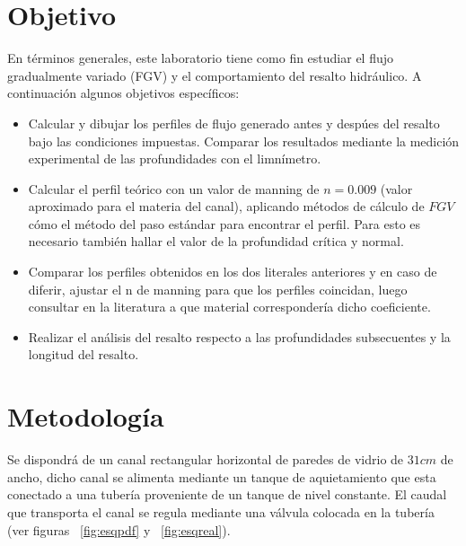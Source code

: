 \documentclass[10pt, a4paper]{exam}
\begin{document}
\section{Objetivo}

En términos generales, este laboratorio tiene como fin estudiar el flujo gradualmente variado (FGV) y el comportamiento del resalto hidráulico. A continuación algunos objetivos específicos:

\begin{itemize}

    \item Calcular y dibujar los perfiles de flujo generado antes y desp\'ues del resalto bajo las condiciones impuestas. Comparar los resultados mediante la medición experimental de las profundidades con el limnímetro.
    
    \item Calcular el perfil teórico con un valor de manning de $n=0.009$ (valor aproximado para el materia del canal), aplicando métodos de cálculo de $FGV$ cómo el método del paso estándar para encontrar el perfil. Para esto es necesario tambi\'en hallar el valor de la profundidad crítica y normal.
    
    \item Comparar los perfiles obtenidos en los dos literales anteriores y en caso de diferir, ajustar el n de manning para que los perfiles coincidan, luego consultar en la literatura a que material correspondería dicho coeficiente.

    \item Realizar el análisis del resalto respecto a las profundidades subsecuentes y la longitud del resalto.
    
\end{itemize}


\section{Metodología}

Se dispondrá de un canal rectangular horizontal de paredes de vidrio de $31cm$ de ancho, dicho canal se alimenta mediante un tanque de aquietamiento que esta  conectado a una tubería proveniente de un tanque de nivel constante. El caudal que transporta el canal se regula mediante una válvula colocada en la tubería (ver figuras ~\ref{fig:esqpdf} y ~\ref{fig:esqreal}).
\end{document}

